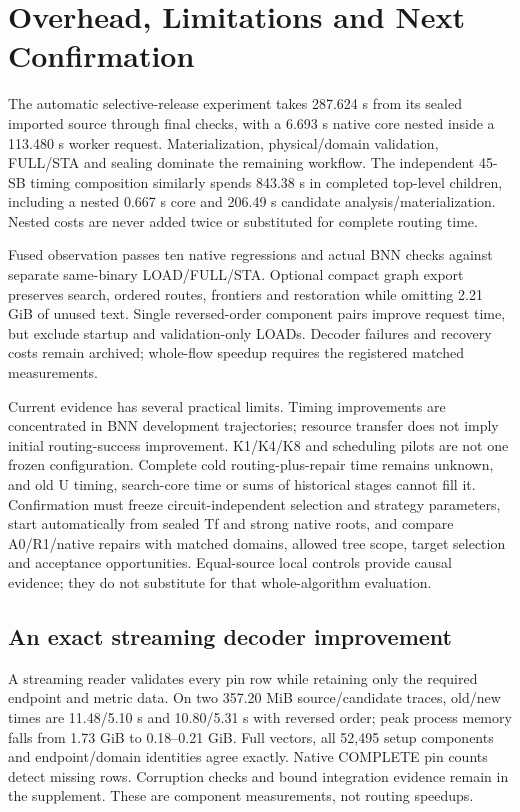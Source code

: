 \documentclass[conference,10pt]{IEEEtran}
\begin{document}
\section{Overhead, Limitations and Next Confirmation}
The automatic selective-release experiment takes 287.624 s from its sealed imported source through final checks, with a 6.693 s native core nested inside a 113.480 s worker request. Materialization, physical/domain validation, FULL/STA and sealing dominate the remaining workflow. The independent 45-SB timing composition similarly spends 843.38 s in completed top-level children, including a nested 0.667 s core and 206.49 s candidate analysis/materialization. Nested costs are never added twice or substituted for complete routing time.

Fused observation passes ten native regressions and actual BNN checks against separate same-binary LOAD/FULL/STA. Optional compact graph export preserves search, ordered routes, frontiers and restoration while omitting 2.21 GiB of unused text. Single reversed-order component pairs improve request time, but exclude startup and validation-only LOADs. Decoder failures and recovery costs remain archived; whole-flow speedup requires the registered matched measurements.

Current evidence has several practical limits. Timing improvements are concentrated in BNN development trajectories; resource transfer does not imply initial routing-success improvement. K1/K4/K8 and scheduling pilots are not one frozen configuration. Complete cold routing-plus-repair time remains unknown, and old U timing, search-core time or sums of historical stages cannot fill it. Confirmation must freeze circuit-independent selection and strategy parameters, start automatically from sealed Tf and strong native roots, and compare A0/R1/native repairs with matched domains, allowed tree scope, target selection and acceptance opportunities. Equal-source local controls provide causal evidence; they do not substitute for that whole-algorithm evaluation.

\subsection{An exact streaming decoder improvement}
A streaming reader validates every pin row while retaining only the required endpoint and metric data. On two 357.20 MiB source/candidate traces, old/new times are 11.48/5.10 s and 10.80/5.31 s with reversed order; peak process memory falls from 1.73 GiB to 0.18--0.21 GiB. Full vectors, all 52,495 setup components and endpoint/domain identities agree exactly. Native COMPLETE pin counts detect missing rows. Corruption checks and bound integration evidence remain in the supplement. These are component measurements, not routing speedups.
\end{document}
